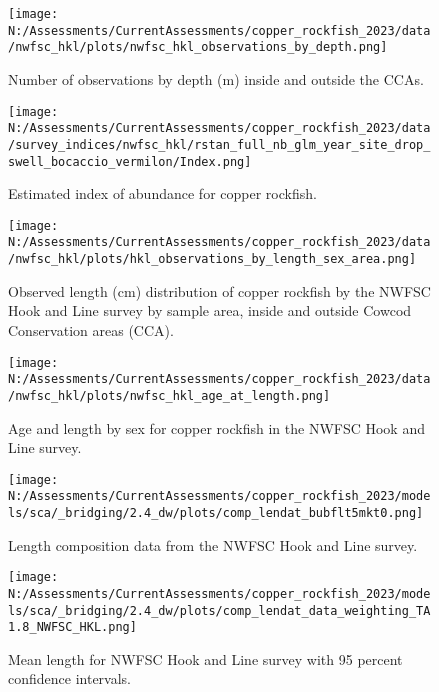 \documentclass[11pt,
  english,
  letterpaper,
]{article}
\begin{document}
\begin{figure}
\centering
\texttt{[image: N:/Assessments/CurrentAssessments/copper\_rockfish\_2023/data/nwfsc\_hkl/plots/nwfsc\_hkl\_observations\_by\_depth.png]}
\caption{Number of observations by depth (m) inside and outside the CCAs.\label{fig:nwfsc-hkl-depth}}
\end{figure}

\begin{figure}
\centering
\texttt{[image: N:/Assessments/CurrentAssessments/copper\_rockfish\_2023/data/survey\_indices/nwfsc\_hkl/rstan\_full\_nb\_glm\_year\_site\_drop\_swell\_bocaccio\_vermilon/Index.png]}
\caption{Estimated index of abundance for copper rockfish.\label{fig:nwfsc-hkl-index-main}}
\end{figure}

\begin{figure}
\centering
\texttt{[image: N:/Assessments/CurrentAssessments/copper\_rockfish\_2023/data/nwfsc\_hkl/plots/hkl\_observations\_by\_length\_sex\_area.png]}
\caption{Observed length (cm) distribution of copper rockfish by the NWFSC Hook and Line survey by sample area, inside and outside Cowcod Conservation areas (CCA).\label{fig:nwfsc-hkl-site-len}}
\end{figure}

\begin{figure}
\centering
\texttt{[image: N:/Assessments/CurrentAssessments/copper\_rockfish\_2023/data/nwfsc\_hkl/plots/nwfsc\_hkl\_age\_at\_length.png]}
\caption{Age and length by sex for copper rockfish in the NWFSC Hook and Line survey.\label{fig:nwfsc-hkl-len-age}}
\end{figure}

\begin{figure}
\centering
\texttt{[image: N:/Assessments/CurrentAssessments/copper\_rockfish\_2023/models/sca/\_bridging/2.4\_dw/plots/comp\_lendat\_bubflt5mkt0.png]}
\caption{Length composition data from the NWFSC Hook and Line survey.\label{fig:hkl-len-data}}
\end{figure}

\begin{figure}
\centering
\texttt{[image: N:/Assessments/CurrentAssessments/copper\_rockfish\_2023/models/sca/\_bridging/2.4\_dw/plots/comp\_lendat\_data\_weighting\_TA1.8\_NWFSC\_HKL.png]}
\caption{Mean length for NWFSC Hook and Line survey with 95 percent confidence intervals.\label{fig:mean-hkl-len-data}}
\end{figure}
\end{document}
